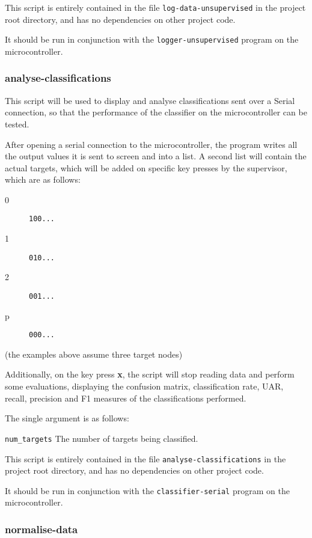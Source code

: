 \documentclass[a4paper]{article}
\begin{document}
This script is entirely contained in the file \lstinline{log-data-unsupervised} in the project root directory, and has no dependencies on other project code.

It should be run in conjunction with the \lstinline{logger-unsupervised} program on the microcontroller.

\newpage
\subsubsection{analyse-classifications}
\label{subsubsec:dc_csa_analyse}

This script will be used to display and analyse classifications sent over a Serial connection, so that the performance of the classifier on the microcontroller can be tested.

After opening a serial connection to the microcontroller, the program writes all the output values it is sent to screen and into a list. A second list will contain the actual targets, which will be added on specific key presses by the supervisor, which are as follows:

\begin{description}
\item[0] \lstinline|100...|
\item[1] \lstinline|010...|
\item[2] \lstinline|001...|
\item[p] \lstinline|000...|
\end{description}

(the examples above assume three target nodes)

Additionally, on the key press \textbf{x}, the script will stop reading data and perform some evaluations, displaying the confusion matrix, classification rate, UAR, recall, precision and F1 measures of the classifications performed.

The single argument is as follows:

\lstinline{num_targets} The number of targets being classified.

This script is entirely contained in the file \lstinline{analyse-classifications} in the project root directory, and has no dependencies on other project code.

It should be run in conjunction with the \lstinline{classifier-serial} program on the microcontroller.

\subsubsection{normalise-data}
\label{subsubsec:dc_csa_normalise}
\end{document}
